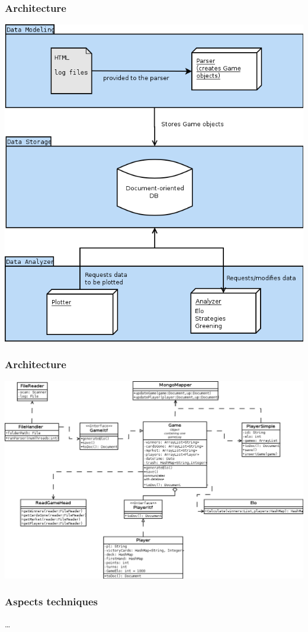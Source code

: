 \documentclass{beamer}
\begin{document}
\begin{frame}
  \frametitle{Architecture}
  \begin{center}
    \includegraphics[scale=0.30,keepaspectratio]{globalArch_v2}
    \end{center}
\end{frame}

\begin{frame}
  \frametitle{Architecture}
  \begin{center}
    \includegraphics[scale=0.27,keepaspectratio]{parserArch}
    \end{center}
\end{frame}

\begin{frame}
  \frametitle{Aspects techniques}
…
\end{frame}
\end{document}
